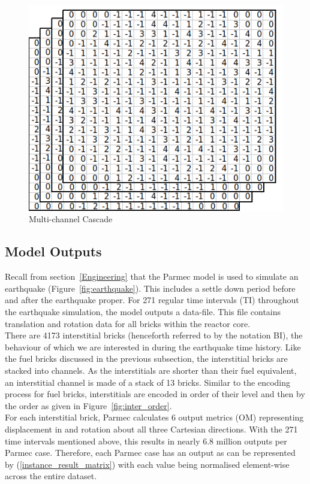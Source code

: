 \begin{figure}[t]
	\centering
	\includegraphics[scale=0.45]{Figures/InputCascade.png}
	\caption{Multi-channel Cascade}
	\label{fig:cascade}
\end{figure}

\subsection{Model Outputs} \label{parmec:output}

Recall from section~\ref{Engineering} that the Parmec model is used to simulate an earthquake (Figure~\ref{fig:earthquake}). This includes a settle down period before and after the earthquake proper. For 271 regular time intervals (TI) throughout the earthquake simulation, the model outputs a data-file. This file contains translation and rotation data for all bricks within the reactor core. 
\\

\noindent
There are 4173 interstitial bricks (henceforth referred to by the notation BI), the behaviour of which we are interested in during the earthquake time history. Like the fuel bricks discussed in the previous subsection, the interstitial bricks are stacked into channels. As the interstitials are shorter than their fuel equivalent, an interstitial channel is made of a stack of 13 bricks. Similar to the encoding process for fuel bricks, interstitials are encoded in order of their level and then by the order as given in Figure~\ref{fig:inter_order}.
\\

\noindent
For each interstitial brick, Parmec calculates 6 output metrics (OM) representing displacement in and rotation about all three Cartesian directions. With the 271 time intervals mentioned above, this results in nearly 6.8 million outputs per Parmec case. Therefore, each Parmec case has an output as can be represented by (\ref{instance_result_matrix}) with each value being normalised element-wise across the entire dataset.  
\\

